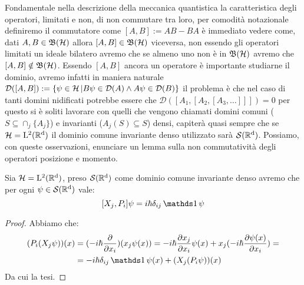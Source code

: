 Fondamentale nella descrizione della meccanica quantistica la caratteristica degli operatori, limitati e non, di non commutare tra loro, per comodità notazionale definiremo il commutatore come $[A,B]:= AB - BA$ è immediato vedere come, dati $A,B \in \operatorname{\mathfrak{B}(\mathcal{H})}$ allora $[A,B] \in \operatorname{\mathfrak{B}(\mathcal{H})}$ viceversa, non essendo gli operatori limitati un ideale bilatero avremo che se almeno uno non è in $\operatorname{\mathfrak{B}(\mathcal{H})}$ avremo che $[A,B] \notin \operatorname{\mathfrak{B}(\mathcal{H})}$. Essendo $[A,B]$ ancora un operatore è importante studiarne il dominio, avremo infatti in maniera naturale $\mathcal{D}([A,B]):= \{ \psi \in \operatorname{\mathcal{H}} | B\psi \in \mathcal{D}(A) \land A\psi  \in \mathcal{D}(B)\}$ il problema è che nel caso di tanti domini nidificati potrebbe essere che $\mathcal{D}([A_1,[A_2,[A_3, \dots ]]])={0}$ per questo si è soliti lavorare con quelli che vengono chiamati domini comuni ($S \subseteq \cap_j \{A_j \}$) e invarianti ($A_j (S) \subseteq S$) densi, capiterà quasi sempre che se $\operatorname{\mathcal{H}} = \operatorname{L^2(\mathbb{R}^d)}$ il dominio comune invariante denso utilizzato sarà $\operatorname{\mathcal{S}(\mathbb{R}^d)}$. Possiamo, con queste osservazioni, enunciare un lemma sulla non commutatività degli operatori posizione e momento.
\begin{lemma}
    Sia $\operatorname{\mathcal{H}} = \operatorname{L^2(\mathbb{R}^d)}$, preso $\operatorname{\mathcal{S}(\mathbb{R}^d)}$ come dominio comune invariante denso avremo che per ogni $\psi \in \operatorname{\mathcal{S}(\mathbb{R}^d)}$ vale:
$$[X_j, P_i] \psi = i \hbar \delta_{ij} \un \psi$$ 
\end{lemma}

\begin{proof}
    Abbiamo che:
\begin{align*}
 (P_i(X_j\psi))(x) &= (-i \hbar \dfrac{\partial}{\partial x_i})(x_j \psi(x))= -i\hbar \dfrac{\partial x_j}{\partial x_i} \psi (x) + x_j(-i \hbar \dfrac{\partial \psi (x)}{\partial x_i}) = \\
&= - i \hbar \delta_{ij} \un \psi (x) + (X_j(P_i \psi))(x)
\end{align*}
Da cui la tesi.
\end{proof}